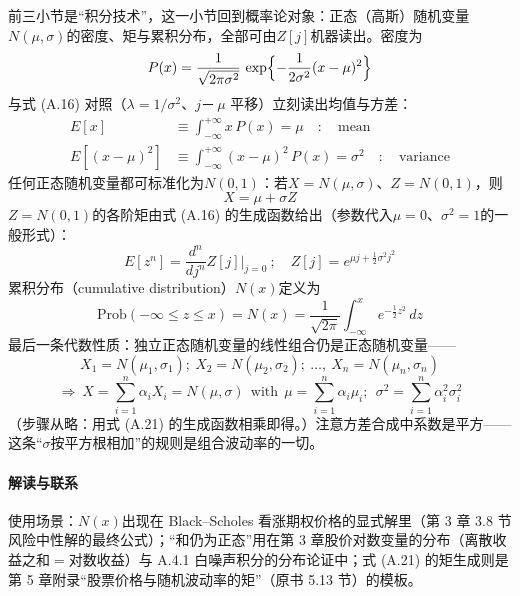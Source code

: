 前三小节是“积分技术”，这一小节回到概率论对象：正态（高斯）随机变量$N(\mu,\sigma)$的密度、矩与累积分布，全部可由$Z[j]$机器读出。密度为
\begin{equation*}
P(x)=\frac{1}{\sqrt{2\pi\sigma^2}}\,
\exp\Bigl\{-\frac{1}{2\sigma^2}(x-\mu)^2\Bigr\}
\end{equation*}
与式 (A.16) 对照（$\lambda=1/\sigma^2$、$j$－\,$\mu$ 平移）立刻读出均值与方差：
\begin{align*}
E[x]&\equiv\int_{-\infty}^{+\infty}x\,P(x)=\mu
\quad:\quad\text{mean}\\
E[(x-\mu)^2]&\equiv\int_{-\infty}^{+\infty}(x-\mu)^2\,P(x)=\sigma^2
\quad:\quad\text{variance}
\end{align*}
任何正态随机变量都可标准化为$N(0,1)$：若$X=N(\mu,\sigma)$、$Z=N(0,1)$，则
\begin{equation*}
X=\mu+\sigma Z
\end{equation*}
$Z=N(0,1)$的各阶矩由式 (A.16) 的生成函数给出（参数代入$\mu=0$、$\sigma^2=1$的一般形式）：
\begin{equation*}
E[z^n]=\frac{d^n}{dj^n}Z[j]|_{j=0}
\ ;\quad
Z[j]=e^{\mu j+\frac{1}{2}\sigma^2 j^2}
\tag{A.21}
\end{equation*}
累积分布（cumulative distribution）$N(x)$定义为
\begin{equation*}
\mathrm{Prob}(-\infty\le z\le x)=N(x)
=\frac{1}{\sqrt{2\pi}}\int_{-\infty}^{x}e^{-\frac{1}{2}z^2}\,dz
\tag{A.22}
\end{equation*}
最后一条代数性质：独立正态随机变量的线性组合仍是正态随机变量——
\begin{equation*}
X_1=N(\mu_1,\sigma_1);\ X_2=N(\mu_2,\sigma_2);\ \ldots,\ X_n=N(\mu_n,\sigma_n)
\end{equation*}
\begin{equation*}
\Rightarrow\ X=\sum_{i=1}^{n}\alpha_i X_i=N(\mu,\sigma)
\ \ \text{with}\ \
\mu=\sum_{i=1}^{n}\alpha_i\mu_i;\ \
\sigma^2=\sum_{i=1}^{n}\alpha_i^2\sigma_i^2
\end{equation*}
（步骤从略：用式 (A.21) 的生成函数相乘即得。）注意方差合成中系数是平方——这条“$\sigma$按平方根相加”的规则是组合波动率的一切。

\paragraph{解读与联系}
使用场景：$N(x)$出现在 Black--Scholes 看涨期权价格的显式解里（第 3 章 3.8 节风险中性解的最终公式）；“和仍为正态”用在第 3 章股价对数变量的分布（离散收益之和$=$对数收益）与 A.4.1 白噪声积分的分布论证中；式 (A.21) 的矩生成则是第 5 章附录“股票价格与随机波动率的矩”（原书 5.13 节）的模板。

